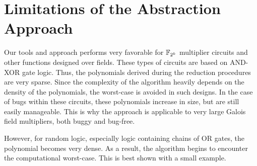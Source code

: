 \FloatBarrier

\section{Limitations of the Abstraction Approach}

Our tools and approach performs very favorable for ${\mathbb{F}}_{2^k}$ multiplier circuits and other 
functions designed over fields. These types of circuits are based on AND-XOR gate logic. 
Thus, the polynomials 
derived during the reduction procedures are very sparse. Since the  
complexity of the algorithm heavily depends on the density of the polynomials,
the worst-case is avoided in such designs.
In the case of bugs within these circuits, these polynomials increase in size, but are
still easily manageable. This is why the approach is applicable to
very large Galois field multipliers, both buggy and bug-free.

However, for random logic, especially logic containing chains of
OR gates, the polynomial becomes very dense. As a result, the algorithm begins 
to encounter the computational worst-case.  
This is best shown with a small example.

